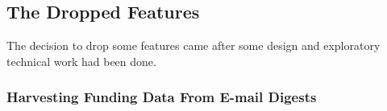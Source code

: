 \subsection{The Dropped Features}
The decision to drop some features came after some design and exploratory technical work had been done.

\subsubsection{Harvesting Funding Data From E-mail Digests}
\label{impl-email-parse}
